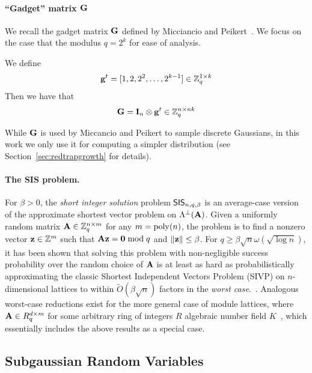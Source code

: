 \paragraph{``Gadget'' matrix $\mathbf{G}$}
We recall the gadget matrix $\mathbf{G}$ defined by Micciancio and
Peikert~\cite{DBLP:conf/eurocrypt/MicciancioP12}. We focus on the case
that the modulus $q=2^{k}$ for ease of analysis.

We define
\[\mathbf{g}^{t}=[1,2,2^2,\ldots,2^{k-1}] \in \mathbb{Z}_q^{1 \times k}\]
Then we have that 
\[\mathbf{G} = \mathbf{I}_{n}
\otimes \mathbf{g}^{t} \in \mathbb{Z}_q^{n \times nk}\] 

While $\mathbf{G}$ is used by Miccancio and Peikert to sample discrete
Gaussians, in this work we only use it for computing a simpler
distribution (see Section~\ref{sec:redtrapgrowth} for details).



\paragraph{The SIS problem.} For $\beta > 0$, the \emph{short integer
  solution} problem $\mathsf{SIS}_{n,q,\beta}$ is an average-case version of the
approximate shortest vector problem on $\Lambda^{\perp}(\mathbf{A})$. Given a
uniformly random matrix $\mathbf{A} \in \mathbb{Z}_q^{n \times m}$ for any
$m=\operatorname{poly}(n)$, the problem is to find a nonzero vector $\mathbf{z} \in \mathbb{Z}^m$
such that $\mathbf{A}\mathbf{z}=\mathbf{0} \bmod{q}$ and $\lVert\mathbf{z}\rVert \leq
\beta$. For $q \geq \beta\sqrt{n}\omega(\sqrt{\log{n}})$, it has been
shown that solving this problem with non-negligible success
probability over the random choice of $\mathbf{A}$ is at least as hard as
probabilistically approximating the classic Shortest Independent Vectors
Problem (SIVP) on $n$-dimensional lattices to within
$\tilde{O}(\beta\sqrt{n})$ factors in the \emph{worst
  case}.~\cite{ajtai04:_gener_hard_instan_lattic_probl,DBLP:journals/siamcomp/MicciancioR07,DBLP:conf/stoc/GentryPV08}. Analogous
worst-case reductions exist for the more general case of module lattices, where
$\mathbf{A} \in R_q^{d \times m}$ for some arbitrary ring of integers $R$
algebraic number field $K$~\cite{DBLP:journals/dcc/LangloisS15}, which
essentially includes the above results as a special case.




\subsection{Subgaussian Random Variables}
\label{sec:subgauss}

